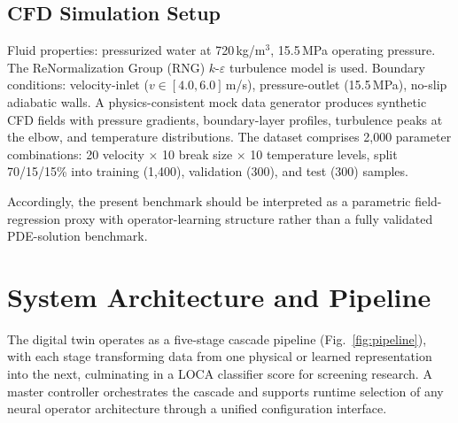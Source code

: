 \documentclass[journal]{IEEEtran}
\begin{document}
\subsection{CFD Simulation Setup}

Fluid properties: pressurized water at 720\,kg/m$^3$, 15.5\,MPa operating pressure. The ReNormalization Group (RNG) $k$-$\varepsilon$ turbulence model is used. Boundary conditions: velocity-inlet ($v \in [4.0, 6.0]$\,m/s), pressure-outlet (15.5\,MPa), no-slip adiabatic walls. A physics-consistent mock data generator produces synthetic CFD fields with pressure gradients, boundary-layer profiles, turbulence peaks at the elbow, and temperature distributions. The dataset comprises 2,000 parameter combinations: 20 velocity $\times$ 10 break size $\times$ 10 temperature levels, split 70/15/15\% into training (1,400), validation (300), and test (300) samples.

Accordingly, the present benchmark should be interpreted as a parametric field-regression proxy with operator-learning structure rather than a fully validated PDE-solution benchmark.

\section{System Architecture and Pipeline}
\label{sec:system}

The digital twin operates as a five-stage cascade pipeline (Fig.~\ref{fig:pipeline}), with each stage transforming data from one physical or learned representation into the next, culminating in a LOCA classifier score for screening research. A master controller orchestrates the cascade and supports runtime selection of any neural operator architecture through a unified configuration interface.
\end{document}
